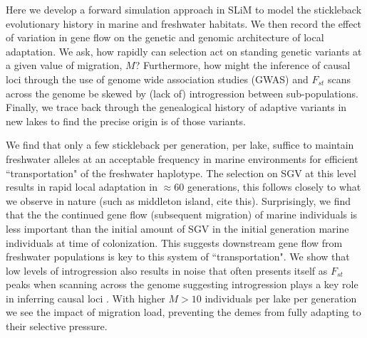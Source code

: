 \documentclass{article}
\begin{document}
Here we develop a forward simulation approach in SLiM to model the stickleback evolutionary history in marine and freshwater habitats.
We then record the effect of variation in gene flow on the genetic and genomic architecture of local adaptation.
We ask, how rapidly can selection act on standing genetic variants at a given value of migration, $M$?
Furthermore, how might the inference of causal loci through the use of genome wide association studies (GWAS) and $F_{st}$ scans across the genome be skewed by (lack of) introgression between sub-populations. 
Finally, we trace back through the genealogical history of adaptive variants in new lakes to find the precise origin is of those variants.

We find that only a few stickleback per generation, per lake, suffice to maintain freshwater alleles at an acceptable frequency in marine environments for efficient ``transportation" of the freshwater haplotype.
The selection on SGV at this level results in rapid local adaptation in $\approx 60$ generations, this follows closely to what we observe in nature (such as middleton island, cite this).
Surprisingly, we find that the the continued gene flow (subsequent migration) of marine individuals is less important than the initial amount of SGV in the initial generation marine individuals at time of colonization.
This suggests downstream gene flow from freshwater populations is key to this system of ``transportation".
We show that low levels of introgression also results in noise that often presents itself as $F_{st}$ peaks when scanning across the genome suggesting introgression plays a key role in inferring causal loci . 
With higher $M > 10$ individuals per lake per generation we see the impact of migration load, preventing the demes from fully adapting to their selective pressure.
\end{document}
